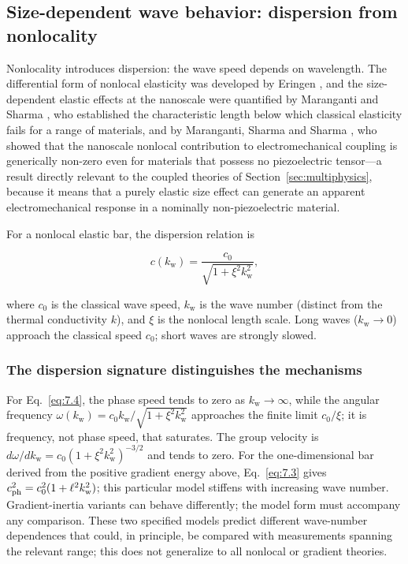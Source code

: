 \subsection{Size-dependent wave behavior: dispersion from nonlocality}
\label{sec:7.3}

Nonlocality introduces dispersion: the wave speed depends on wavelength. The differential form of nonlocal elasticity was developed by Eringen \cite{Eringen1983}, and the size-dependent elastic effects at the nanoscale were quantified by Maranganti and Sharma \cite{Maranganti2007}, who established the characteristic length below which classical elasticity fails for a range of materials, and by Maranganti, Sharma and Sharma \cite{Maranganti2006}, who showed that the nanoscale nonlocal contribution to electromechanical coupling is generically non-zero even for materials that possess no piezoelectric tensor---a result directly relevant to the coupled theories of Section~\ref{sec:multiphysics}, because it means that a purely elastic size effect can generate an apparent electromechanical response in a nominally non-piezoelectric material.

For a nonlocal elastic bar, the dispersion relation is

\begin{equation}
c(k_{\mathrm w}) = \frac{c_0}{\sqrt{1 + \xi^2 k_{\mathrm w}^2}},
\label{eq:7.4}
\end{equation}

where $c_0$ is the classical wave speed, $k_{\mathrm w}$ is the wave number (distinct from the thermal conductivity $k$), and $\xi$ is the nonlocal length scale. Long waves ($k_{\mathrm w} \to 0$) approach the classical speed $c_0$; short waves are strongly slowed.

\subsubsection{The dispersion signature distinguishes the mechanisms}

For Eq.~\eqref{eq:7.4}, the phase speed tends to zero as $k_{\mathrm w}\to\infty$, while the angular frequency $\omega(k_{\mathrm w})=c_0 k_{\mathrm w}/\sqrt{1+\xi^2k_{\mathrm w}^2}$ approaches the finite limit $c_0/\xi$; it is frequency, not phase speed, that saturates. The group velocity is $d\omega/dk_{\mathrm w}=c_0(1+\xi^2k_{\mathrm w}^2)^{-3/2}$ and tends to zero. For the one-dimensional bar derived from the positive gradient energy above, Eq.~\eqref{eq:7.3} gives $c_{\rm ph}^2=c_0^2(1+\ell^2 k_{\mathrm w}^2)$; this particular model stiffens with increasing wave number. Gradient-inertia variants can behave differently; the model form must accompany any comparison. These two specified models predict different wave-number dependences that could, in principle, be compared with measurements spanning the relevant range; this does not generalize to all nonlocal or gradient theories.

